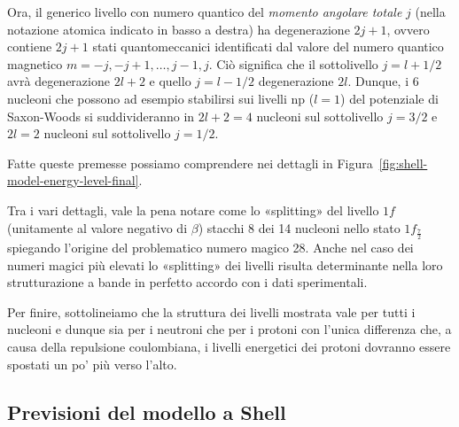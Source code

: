 Ora, il generico livello con numero quantico del \emph{momento angolare totale} $j$ (nella notazione atomica indicato in basso a destra) ha degenerazione $2j+1$, ovvero contiene $2j+1$ stati quantomeccanici identificati dal valore del numero quantico magnetico $m=-j, -j+1,\dots,j-1, j$.
Ciò significa che il sottolivello $j=l+1/2$ avrà degenerazione $2l+2$ e quello $j=l-1/2$ degenerazione $2l$.
Dunque, i 6 nucleoni che possono ad esempio stabilirsi sui livelli np ($l=1$) del potenziale di Saxon-Woods si suddivideranno in $2l+2=4$ nucleoni sul sottolivello $j=3/2$ e $2l=2$ nucleoni sul sottolivello $j=1/2$.

Fatte queste premesse possiamo comprendere nei dettagli in Figura~\ref{fig:shell-model-energy-level-final}.


Tra i vari dettagli, vale la pena notare come lo «splitting» del livello $1f$ (unitamente al valore negativo di $\beta$) stacchi 8 dei 14 nucleoni nello stato $1f_{\frac{7}{2}}$ spiegando l’origine del problematico numero magico 28.
Anche nel caso dei numeri magici più elevati lo «splitting» dei livelli risulta determinante nella loro strutturazione a bande in perfetto accordo con i dati sperimentali.

Per finire, sottolineiamo che la struttura dei livelli mostrata vale per tutti i nucleoni e dunque sia per i neutroni che per i protoni con l’unica differenza che, a causa della repulsione coulombiana, i livelli energetici dei protoni dovranno essere spostati un po' più verso l’alto.

\subsection{Previsioni del modello a Shell}\label{sec:forecast-shell-model}

